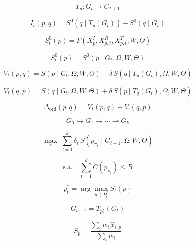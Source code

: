 
\[
T_p : G_t \to G_{t+1}
\]

\[
I_t(p,q)=S^0\left(q\mid T_p(G_t)\right)-S^0\left(q\mid G_t\right)
\]

\[
S_t^0(p)=F\left(X_p^I, X_{p,t}^R, X_{p,t}^T; W,\Theta\right)
\]

\[
S_t^0(p)=S^0\left(p\mid G_t,\Omega,W,\Theta\right)
\]

\[
V_t(p,q)=S\left(p\mid G_t,\Omega,W,\Theta\right)+\delta\,S\left(q\mid T_p(G_t),\Omega,W,\Theta\right)
\]

\[
V_t(q,p)=S\left(q\mid G_t,\Omega,W,\Theta\right)+\delta\,S\left(p\mid T_q(G_t),\Omega,W,\Theta\right)
\]

\[
\Delta_{\mathrm{ord}}(p,q)=V_t(p,q)-V_t(q,p)
\]

\[
G_0 \to G_1 \to \cdots \to G_k
\]

\[
\max_{\pi}\;\sum_{t=1}^{k}\delta_t\,S\left(p_{\pi_t}\mid G_{t-1},\Omega,W,\Theta\right)
\]

\[
\text{s.a.}\quad \sum_{t=1}^{k} C\left(p_{\pi_t}\right) \le B
\]

\[
p_t^{\ast}=\arg\max_{p\in P_t^f} S_t(p)
\]

\[
G_{t+1}=T_{p_t^{\ast}}(G_t)
\]

\[
S_p=\frac{\sum_i w_i\,\hat{x}_{i,p}}{\sum_i w_i}
\]

